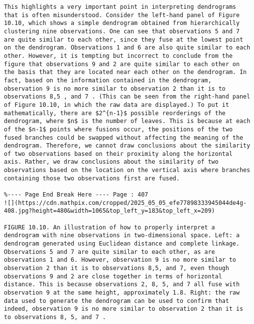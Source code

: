 \documentclass[10pt]{article}
\begin{document}
\begin{verbatim}
This highlights a very important point in interpreting dendrograms that is often misunderstood. Consider the left-hand panel of Figure 10.10, which shows a simple dendrogram obtained from hierarchically clustering nine observations. One can see that observations 5 and 7 are quite similar to each other, since they fuse at the lowest point on the dendrogram. Observations 1 and 6 are also quite similar to each other. However, it is tempting but incorrect to conclude from the figure that observations 9 and 2 are quite similar to each other on the basis that they are located near each other on the dendrogram. In fact, based on the information contained in the dendrogram, observation 9 is no more similar to observation 2 than it is to observations 8,5 , and 7 . (This can be seen from the right-hand panel of Figure 10.10, in which the raw data are displayed.) To put it mathematically, there are $2^{n-1}$ possible reorderings of the dendrogram, where $n$ is the number of leaves. This is because at each of the $n-1$ points where fusions occur, the positions of the two fused branches could be swapped without affecting the meaning of the dendrogram. Therefore, we cannot draw conclusions about the similarity of two observations based on their proximity along the horizontal axis. Rather, we draw conclusions about the similarity of two observations based on the location on the vertical axis where branches containing those two observations first are fused.

%---- Page End Break Here ---- Page : 407
![](https://cdn.mathpix.com/cropped/2025_05_05_efe77898333945044de4g-408.jpg?height=480&width=1065&top_left_y=183&top_left_x=209)

FIGURE 10.10. An illustration of how to properly interpret a dendrogram with nine observations in two-dimensional space. Left: a dendrogram generated using Euclidean distance and complete linkage. Observations 5 and 7 are quite similar to each other, as are observations 1 and 6. However, observation 9 is no more similar to observation 2 than it is to observations 8,5, and 7, even though observations 9 and 2 are close together in terms of horizontal distance. This is because observations 2, 8, 5, and 7 all fuse with observation 9 at the same height, approximately 1.8. Right: the raw data used to generate the dendrogram can be used to confirm that indeed, observation 9 is no more similar to observation 2 than it is to observations 8, 5, and 7 .


\end{verbatim}
\end{document}

